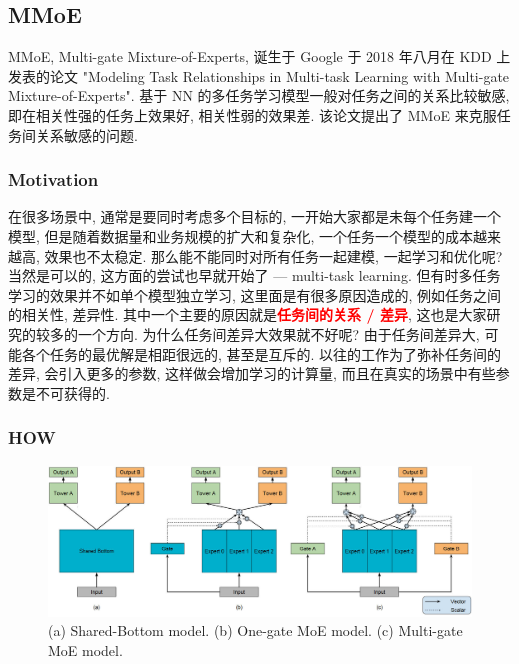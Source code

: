 \subsection{MMoE}
MMoE, Multi-gate Mixture-of-Experts, 诞生于 Google 于 2018 年八月在 KDD 上发表的论文 "Modeling Task Relationships in Multi-task Learning with Multi-gate Mixture-of-Experts". 基于 NN 的多任务学习模型一般对任务之间的关系比较敏感, 即在相关性强的任务上效果好, 相关性弱的效果差. 该论文提出了 MMoE 来克服任务间关系敏感的问题.

\subsubsection{Motivation}
在很多场景中, 通常是要同时考虑多个目标的, 一开始大家都是未每个任务建一个模型, 但是随着数据量和业务规模的扩大和复杂化, 一个任务一个模型的成本越来越高, 效果也不太稳定. 那么能不能同时对所有任务一起建模, 一起学习和优化呢? 当然是可以的, 这方面的尝试也早就开始了 --- multi-task learning. 但有时多任务学习的效果并不如单个模型独立学习, 这里面是有很多原因造成的, 例如任务之间的相关性, 差异性. 其中一个主要的原因就是\textcolor{red}{\textbf{任务间的关系 / 差异}}, 这也是大家研究的较多的一个方向. 为什么任务间差异大效果就不好呢? 由于任务间差异大, 可能各个任务的最优解是相距很远的, 甚至是互斥的. 以往的工作为了弥补任务间的差异, 会引入更多的参数, 这样做会增加学习的计算量, 而且在真实的场景中有些参数是不可获得的.

\subsubsection{HOW}

\begin{figure}[h]
	\centering
	\includegraphics[width=.85\textwidth]{pics/mmoe.jpg}
	\caption{(a) Shared-Bottom model. (b) One-gate MoE model. (c) Multi-gate MoE model.}
	\label{fig:mmoe}
\end{figure}

